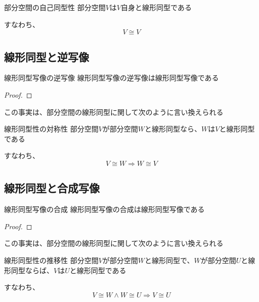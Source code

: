 \documentclass[../../../topic_linear-algebra]{subfiles}
\begin{document}
\begin{theorem*}{部分空間の自己同型性}
  部分空間$V$は$V$自身と線形同型である

  すなわち、
  \begin{equation*}
    V \cong V
  \end{equation*}
\end{theorem*}

\subsection{線形同型と逆写像}

\begin{theorem*}{線形同型写像の逆写像}
  線形同型写像の逆写像は線形同型写像である
\end{theorem*}

\begin{proof}
\end{proof}

この事実は、部分空間の線形同型に関して次のように言い換えられる

\begin{theorem*}{線形同型性の対称性}
  部分空間$V$が部分空間$W$と線形同型なら、$W$は$V$と線形同型である

  すなわち、
  \begin{equation*}
    V \cong W \Longrightarrow W \cong V
  \end{equation*}
\end{theorem*}

\subsection{線形同型と合成写像}

\begin{theorem*}{線形同型写像の合成}
  線形同型写像の合成は線形同型写像である
\end{theorem*}

\begin{proof}
\end{proof}

この事実は、部分空間の線形同型に関して次のように言い換えられる

\begin{theorem*}{線形同型性の推移性}
  部分空間$V$が部分空間$W$と線形同型で、$W$が部分空間$U$と線形同型ならば、$V$は$U$と線形同型である

  すなわち、
  \begin{equation*}
    V \cong W \land W \cong U \Longrightarrow V \cong U
  \end{equation*}
\end{theorem*}
\end{document}
